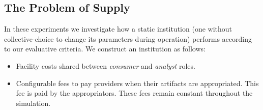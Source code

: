 




\subsection{The Problem of Supply}\label{sec:supply}

In these experiments we investigate how a static institution (one without
collective-choice to change its parameters during operation) performs
according to our evaluative criteria. We construct an institution as follows:

\begin{itemize}
\item Facility costs shared between \emph{consumer} and \emph{analyst} roles.
\item Configurable fees to pay providers when their artifacts are appropriated. This fee is paid by the appropriators. These fees remain constant throughout the simulation.
\end{itemize}

